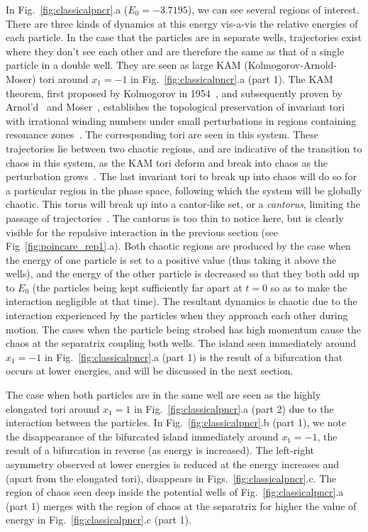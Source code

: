 In Fig.~\ref{fig:classicalpncr}.a ($E_0 = -3.7195$), we can see several regions of interest. There are three  kinds of dynamics at this energy vis-a-vis the relative energies of each particle. In the case that the particles are in separate wells, trajectories exist where they don't see each other and are therefore the same as that of a single particle in a double well. They are seen as large KAM (Kolmogorov-Arnold-Moser) tori around $x_1 = -1$ in Fig.~\ref{fig:classicalpncr}.a (part 1). The KAM theorem, first proposed by Kolmogorov in 1954~\cite{kolmogorov:proofkam}, and subsequently proven by Arnol'd~\cite{arnold:proofkam} and Moser~\cite{moser:proofkam}, establishes the topological preservation of invariant tori with irrational winding numbers under small perturbations in regions containing resonance zones~\cite{reichl}. The corresponding tori are seen in this system. These trajectories lie between two chaotic regions, and are indicative of the transition to chaos in this system, as the KAM tori deform and break into chaos as the perturbation grows~\cite{reichl}. The last invariant tori to break up into chaos will do so for a particular region in the phase space, following which the system will be globally chaotic. This torus will break up into a cantor-like set, or a \textit{cantorus}, limiting the passage of trajectories~\cite{MacKay}. The cantorus is too thin to notice here, but is clearly visible for the repulsive interaction in the previous section (see Fig~\ref{fig:poincare_rep1}.a). Both chaotic regions are produced by the case when the energy of one particle is set to a positive value (thus taking it above the wells), and the energy of the other particle is decreased so that they both add up to $E_0$ (the particles being kept sufficiently far apart at $t=0$ so as to make the interaction negligible at that time). The resultant dynamics is chaotic due to the interaction experienced by the particles when they approach each other during motion. The cases when the particle being strobed has high momentum cause the chaos at the separatrix coupling both wells.
The island seen immediately around $x_1 = -1$ in Fig.~\ref{fig:classicalpncr}.a (part 1) is the result of a bifurcation that occurs at lower energies, and will be discussed in the next section.

The case when both particles are in the same well are seen as the highly elongated tori around $x_1 = 1$ in Fig.~\ref{fig:classicalpncr}.a (part 2) due to the interaction between the particles. In Fig.~\ref{fig:classicalpncr}.b (part 1), we note the disappearance of the bifurcated island immediately around $x_1 = -1$, the result of a bifurcation in reverse (as energy is increased).  The left-right asymmetry observed at lower energies is  reduced at the energy increases and (apart from the elongated tori), disappears in Figs.~\ref{fig:classicalpncr}.c.  The region of chaos seen deep  inside  the potential  wells of Fig.~\ref{fig:classicalpncr}.a (part 1) merges with the region of chaos at the separatrix for higher the value of energy in Fig.~\ref{fig:classicalpncr}.c (part 1). 

